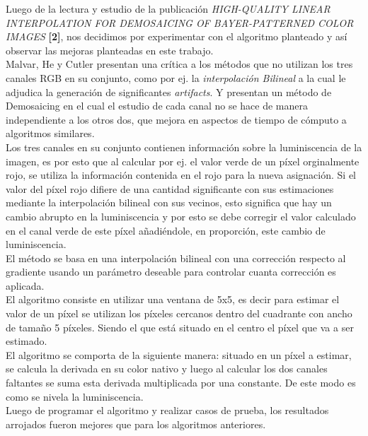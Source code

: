 \documentclass[a4paper]{article}
\begin{document}
Luego de la lectura y estudio de la publicaci\'on \textit{HIGH-QUALITY LINEAR INTERPOLATION
FOR DEMOSAICING OF BAYER-PATTERNED COLOR IMAGES} \textbf{[2]}, nos decidimos por experimentar con el algoritmo planteado y as\'i observar las mejoras planteadas en este trabajo.\\

Malvar, He y Cutler presentan una cr\'itica a los m\'etodos que no utilizan los tres canales RGB en su conjunto, como por ej. la \emph{interpolaci\'on Bilineal} a la cual le adjudica la generaci\'on de significantes \textit{artifacts}. Y presentan un m\'etodo de Demosaicing en el cual el estudio de cada canal no se hace de manera independiente a los otros dos, que mejora en aspectos de tiempo de c\'omputo a algoritmos similares.\\

Los tres canales en su conjunto contienen informaci\'on sobre la luminiscencia de la imagen, es por esto que al calcular por ej. el valor verde de un p\'ixel orginalmente rojo, se utiliza la informaci\'on contenida en el rojo para la nueva asignaci\'on. Si el valor del p\'ixel rojo difiere de una cantidad significante con sus estimaciones mediante la interpolaci\'on bilineal con sus vecinos, esto significa que hay un cambio abrupto en la luminiscencia y por esto se debe corregir el valor calculado en el canal verde de este p\'ixel a\~nadi\'endole, en proporci\'on, este cambio de luminiscencia.\\

El m\'etodo se basa en una interpolaci\'on bilineal con una correcci\'on respecto al gradiente usando un par\'ametro deseable para controlar cuanta correcci\'on es aplicada.\\

El algoritmo consiste en utilizar una ventana de 5x5, es decir para estimar el valor de un p\'ixel se utilizan los p\'ixeles cercanos dentro del cuadrante con ancho de tama\~no 5 p\'ixeles. Siendo el que est\'a situado en el centro el p\'ixel que va a ser estimado.\\

El algoritmo se comporta de la siguiente manera: situado en un p\'ixel a estimar, se calcula la derivada en su color nativo y luego al calcular los dos canales faltantes se suma esta derivada multiplicada por una constante. De este modo es como se nivela la luminiscencia.\\

Luego de programar el algoritmo y realizar casos de prueba, los resultados arrojados fueron mejores que para los algoritmos anteriores.\\
\end{document}
